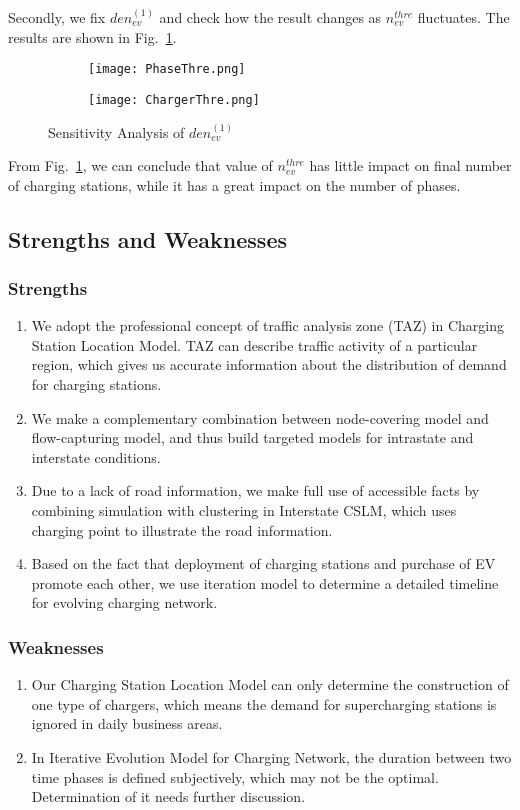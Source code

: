 \documentclass{mcmthesis}
\begin{document}
Secondly, we fix $den_{ev}^{(1)}$ and check how the result changes as $n_{ev}^{thre}$ fluctuates. The results are shown in Fig.~\ref{Fig-SenThre}.

\begin{figure}[htbp]
    \centering
    \begin{subfigure}[b]{0.45\textwidth}
		\texttt{[image: PhaseThre.png]}
	\end{subfigure}
    \begin{subfigure}[b]{0.45\textwidth}
		\texttt{[image: ChargerThre.png]}
	\end{subfigure}
    \caption{Sensitivity Analysis of $den_{ev}^{(1)}$}\label{Fig-SenThre}
\end{figure}
From Fig.~\ref{Fig-SenThre}, we can conclude that value of $n_{ev}^{thre}$ has little impact on final number of charging stations, while it has a great impact on the number of phases.
\subsection{Strengths and Weaknesses}
\subsubsection*{Strengths}
\begin{enumerate}
\item We adopt the professional concept of traffic analysis zone (TAZ) in Charging Station Location Model. TAZ can describe traffic activity of a particular region, which gives us accurate information about the distribution of demand for charging stations.
\item We make a complementary combination between node-covering model and flow-capturing model, and thus build targeted models for intrastate and interstate conditions.
\item Due to a lack of road information, we make full use of accessible facts by combining simulation with clustering in Interstate CSLM, which uses charging point to illustrate the road information.
\item Based on the fact that deployment of charging stations and purchase of EV promote each other, we use iteration model to determine a detailed timeline for evolving charging network.
\end{enumerate}
\subsubsection*{Weaknesses}
\begin{enumerate}
\item Our Charging Station Location Model can only determine the construction of one type of chargers, which means the demand for supercharging stations is ignored in daily business areas.
\item In Iterative Evolution Model for Charging Network, the duration between two time phases is defined subjectively, which may not be the optimal. Determination of it needs further discussion.
\end{enumerate}
\end{document}
